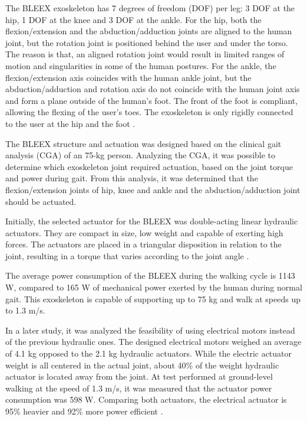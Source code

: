    The BLEEX exoskeleton has 7 degrees of freedom (DOF) per leg: 3 DOF at the hip, 1 DOF at the knee and 3 DOF at the ankle. For the hip, both the flexion/extension and the abduction/adduction joints are aligned to the human joint, but the rotation joint is positioned behind the user and under the torso. The reason is that, an aligned rotation joint would result in limited ranges of motion and singularities in some of the human postures. For the ankle, the flexion/extension axis coincides with the human ankle joint, but the abduction/adduction and rotation axis do not coincide with the human joint axis and form a plane outside of the human's foot. The front of the foot is compliant, allowing the flexing of the user's toes. The exoskeleton is only rigidly connected to the user at the hip and the foot \cite{Zoss1618670}.
   
   The BLEEX structure and actuation was designed based on the clinical gait analysis (CGA) of an 75-kg person. Analyzing the CGA, it was possible to determine which exoskeleton joint required actuation, based on the joint torque and power during gait. From this analysis, it was determined that the flexion/extension joints of hip, knee and ankle and the abduction/adduction joint should be actuated. 
   
   Initially, the selected actuator for the BLEEX was double-acting linear hydraulic actuators. They are compact in size, low weight and capable of exerting high forces. The actuators are placed in a triangular disposition in relation to the joint, resulting in a torque that varies according to the joint angle \cite{Chu1570789}.
   
   The average power consumption of the BLEEX during the walking cycle is 1143 W, compared to 165 W of mechanical power exerted by the human during normal gait. This exoskeleton is capable of supporting up to 75 kg and walk at speeds up to 1.3 m/s.
   
   In a later study, it was analyzed the feasibility of using electrical motors instead of the previous hydraulic ones. The designed electrical motors weighed an average of 4.1 kg opposed to the 2.1 kg hydraulic actuators. While the electric actuator weight is all centered in the actual joint, about 40\% of the weight hydraulic actuator is located away from the joint. At test performed at ground-level walking at the speed of 1.3 m/s, it was measured that the actuator power consumption was 598 W. Comparing both actuators, the electrical actuator is 95\% heavier and 92\% more power efficient \cite{Zoss2006}.
   
